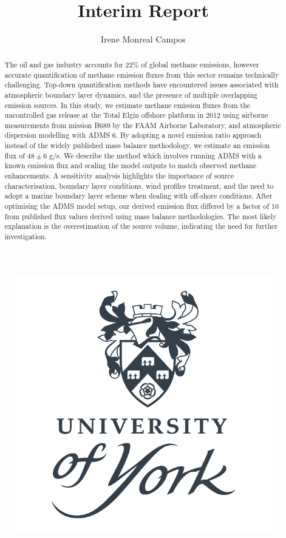 \documentclass[12pt]{article}
\title{
    \textbf{\thesistitle} \\~\\
    \large Interim Report 
    }
\author{Irene Monreal Campos}
\begin{document}
\maketitle
\begin{figure}[bht]
    \centering
    \includegraphics[width=.7\linewidth]{Plots/York Logo.png}
\end{figure}
\tableofcontents
\bigskip
\newpage

\pagestyle{fancy}
\rhead{\slshape\nouppercase{\leftmark}}
\lhead[E,O]{}

\begin{abstract}
The oil and gas industry accounts for 22\% of global methane emissions\parencite{Saunois2020The20002017}, however accurate quantification of methane emission fluxes from this sector remains technically challenging. Top-down quantification methods have encountered issues associated with atmospheric boundary layer dynamics, and the presence of multiple overlapping emission sources.
In this study, we estimate methane emission fluxes from the uncontrolled gas release at the Total Elgin offshore platform in 2012 using airborne measurements from mission B689 by the FAAM Airborne Laboratory, and atmospheric dispersion modelling with ADMS 6. By adopting a novel emission ratio approach instead of the widely published mass balance methodology, we estimate an emission flux of $48\pm6$ g/s. 
We describe the method which involves running ADMS with a known emission flux and scaling the model outputs to match observed methane enhancements. 
A sensitivity analysis highlights the importance of source characterisation, boundary layer conditions, wind profiles treatment, and the need to adopt a marine boundary layer scheme when dealing with off-shore conditions. 
After optimising the ADMS model setup, our derived emission flux differed by a factor of 10 from published flux values derived using mass balance methodologies. The most likely explanation is the overestimation of the source volume, indicating the need for further investigation.

\end{abstract}
\end{document}
